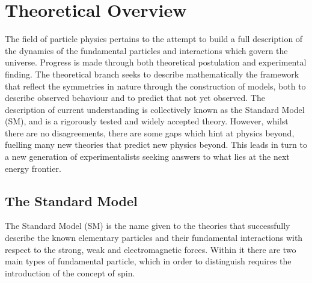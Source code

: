 \chapter{Theoretical Overview}
\label{ch:theory}
 
The field of particle physics pertains to the attempt to build a full description of the dynamics of the fundamental particles and interactions which govern the universe. Progress is made through both theoretical postulation and experimental finding. The theoretical branch seeks to describe mathematically the framework that reflect the symmetries in nature through the construction of models, both to describe observed behaviour and to predict that not yet observed. The description of current understanding is collectively known as the Standard Model (SM), and is a rigorously tested and widely accepted theory. However, whilst there are no disagreements, there are some gaps which hint at physics beyond, fuelling many new theories that predict new physics beyond. This leads in turn to a  new generation of experimentalists seeking answers to what lies at the next energy frontier.

\section{The Standard Model}

The Standard Model (SM) is the name given to the theories that successfully describe the known elementary particles and their fundamental interactions with respect to the strong, weak and electromagnetic forces. Within it there are two main types of fundamental particle, which in order to distinguish requires the introduction of the concept of spin.

